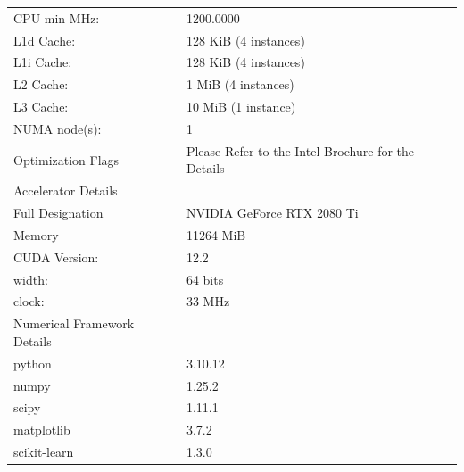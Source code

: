 {\begin{table}
\begin{tabular}{||l l||}
     CPU min MHz:                 & 1200.0000                                         	  	\\
     L1d Cache:                   & 128 KiB (4 instances)                           	    	\\
     L1i Cache:                   & 128 KiB (4 instances) 	 	                              \\
     L2 Cache:                    & 1 MiB (4 instances) 	                                 	\\
     L3 Cache:                    & 10 MiB (1 instance) 	 	                                \\
     NUMA node(s):                & 1                                               	 	    \\
     Optimization Flags           & Please Refer to the Intel Brochure for the Details  		\\[1ex] 
     \hline
     \hline
     Accelerator Details 			    &  					                                            	\\[0.5ex] 
     \hline\hline
     Full Designation 	    			& NVIDIA GeForce RTX 2080 Ti 	                            \\ 
     Memory   	              		& 11264 MiB 	                                           	\\
     CUDA Version:                & 12.2  	                                               	\\
     width:                       & 64 bits                                                 \\
     clock:                       & 33 MHz 	                                                \\[1ex] 
     \hline
     \hline
     Numerical Framework Details	&  				                                            		\\[0.5ex] 
     \hline\hline
     python                       & 3.10.12                                                 \\
     numpy                        & 1.25.2  		                                            \\
     scipy                        & 1.11.1  		                                            \\
     matplotlib                   & 3.7.2   		                                            \\
     scikit-learn                 & 1.3.0  		                                              \\

\end{tabular}
\end{table}}
